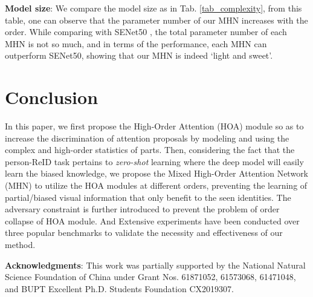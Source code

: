 \documentclass[10pt,twocolumn,letterpaper]{article}
\begin{document}
\textbf{Model size}: We compare the model size as in Tab. \ref{tab_complexity}, from this table, one can observe that the parameter number of our MHN increases with the order. While comparing with SENet50 \cite{hu2018squeeze}, the total parameter number of each MHN is not so much, and in terms of the performance, each MHN can outperform SENet50, showing that our MHN is indeed `light and sweet'.
\begin{table}
  \centering
  \caption{Model size comparisons. PN means Parameter Number.}\label{tab_complexity}
  \vspace{-1.5em}
\end{table}
\vspace{-0.5em}
\section{Conclusion}
\vspace{-0.8em}
In this paper, we first propose the High-Order Attention (HOA) module so as to increase the discrimination of attention proposals by modeling and using the complex and high-order statistics of parts. Then, considering the fact that the person-ReID task pertains to \emph{zero-shot} learning where the deep model will easily learn the biased knowledge, we propose the Mixed High-Order Attention Network (MHN) to utilize the HOA modules at different orders, preventing the learning of partial/biased visual information that only benefit to the seen identities. The adversary constraint is further introduced to prevent the problem of order collapse of HOA module. And Extensive experiments have been conducted over three popular benchmarks to validate the necessity and effectiveness of our method.

\small{\textbf{Acknowledgments}: This work was partially supported by the National Natural Science Foundation of China under Grant Nos. 61871052, 61573068, 61471048, and BUPT Excellent Ph.D. Students Foundation CX2019307.}
{\small


}
\end{document}
